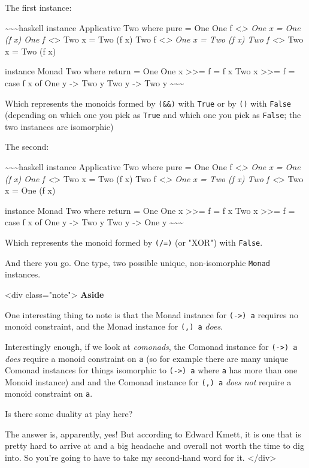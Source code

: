 \documentclass[]{article}
\begin{document}
The first instance:

\textasciitilde{}\textasciitilde{}\textasciitilde{}haskell instance Applicative
Two where pure = One One f \textless{}\emph{\textgreater{} One x = One (f x) One
f \textless{}}\textgreater{} Two x = Two (f x) Two f
\textless{}\emph{\textgreater{} One x = Two (f x) Two f
\textless{}}\textgreater{} Two x = Two (f x)

instance Monad Two where return = One One x \textgreater{}\textgreater{}= f = f
x Two x \textgreater{}\textgreater{}= f = case f x of One y -\textgreater{} Two
y Two y -\textgreater{} Two y
\textasciitilde{}\textasciitilde{}\textasciitilde{}

Which represents the monoids formed by \texttt{(\&\&)} with \texttt{True} or by
\texttt{(\textbar{}\textbar{})} with \texttt{False} (depending on which one you
pick as \texttt{True} and which one you pick as \texttt{False}; the two
instances are isomorphic)

The second:

\textasciitilde{}\textasciitilde{}\textasciitilde{}haskell instance Applicative
Two where pure = One One f \textless{}\emph{\textgreater{} One x = One (f x) One
f \textless{}}\textgreater{} Two x = Two (f x) Two f
\textless{}\emph{\textgreater{} One x = Two (f x) Two f
\textless{}}\textgreater{} Two x = One (f x)

instance Monad Two where return = One One x \textgreater{}\textgreater{}= f = f
x Two x \textgreater{}\textgreater{}= f = case f x of One y -\textgreater{} Two
y Two y -\textgreater{} One y
\textasciitilde{}\textasciitilde{}\textasciitilde{}

Which represents the monoid formed by \texttt{(/=)} (or "XOR") with
\texttt{False}.

And there you go. One type, two possible unique, non-isomorphic \texttt{Monad}
instances.

\textless{}div class="note"\textgreater{} \textbf{Aside}

One interesting thing to note is that the Monad instance for
\texttt{(-\textgreater{})\ a} requires no monoid constraint, and the Monad
instance for \texttt{(,)\ a} \emph{does}.

Interestingly enough, if we look at \emph{comonads}, the Comonad instance for
\texttt{(-\textgreater{})\ a} \emph{does} require a monoid constraint on
\texttt{a} (so for example there are many unique Comonad instances for things
isomorphic to \texttt{(-\textgreater{})\ a} where \texttt{a} has more than one
Monoid instance) and and the Comonad instance for \texttt{(,)\ a} \emph{does
not} require a monoid constraint on \texttt{a}.

Is there some duality at play here?

The answer is, apparently, yes! But according to Edward Kmett, it is one that is
pretty hard to arrive at and a big headache and overall not worth the time to
dig into. So you're going to have to take my second-hand word for it.
\textless{}/div\textgreater{}
\end{document}
